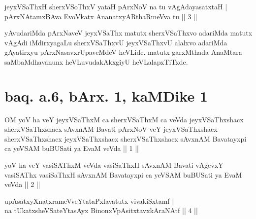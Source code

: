 \begin{shl}
\footnotemark[2]jeyxVSaThxH sherxVSoThxV yataH pArxNoV na tu vAgAdayasatxtaH | \\
pArxNAtamxBAva EvoVkatx AnanatxyARthaRmeVva tu \hfill|| 3 || 
\end{shl}

\begin{artha} 
yAvudariMda pArxNaveV jeyxVSaThx matutx sherxVSaThxvo adariMda matutx 
vAgAdi iMdirxyagaLu sherxVSaThxvU jeyxVSaThxvU alalxvo adariMda 
gAyatirxyu pArxNasavxrUpaveMdeV heVLide. matutx garxMthada AnaMtara 
saMbaMdhavanunx heVLuvudakAkxgiyU heVLalapxTiTxde.
\end{artha}

\section*{baq. a.6, bArx. 1, kaMDike 1}

\begin{shl}
OM yoV ha veY jeyxVSaThxM ca sherxVSaThxM ca veVda jeyxVSaThxshacx sherxVSaThxshacx sAvxnAM Bavati pArxNoV veY jeyxVSaThxshacx sherxVSaThxshacx jeyxVSaThxshacx sherxVSaThxshacx sAvxnAM Bavatayxpi ca yeVSAM buBUSati ya EvaM veVda || 1 ||
\end{shl}

\begin{shl}
yoV ha veY vasiSAThxM veVda vasiSaThxH sAvxnAM Bavati vAgevxY vasiSAThx vasiSaThxH sAvxnAM Bavatayxpi ca yeVSAM buBUSati ya EvaM veVda || 2 ||
\end{shl}

\begin{shl}
upAsatxyXnatxrameVveYtataPxlavatutx vivakiSxtamf | \\
na tUkatxsheVSateYtasAyx BinonxVpAsitxtavxkAraNAtf \hfill|| 4 || 
\end{shl}

